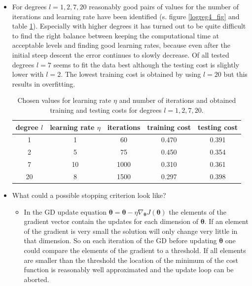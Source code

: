 \documentclass{article}
\begin{document}
\begin{itemize}
\item For degrees $l=1,2,7,20$ reasonably good pairs of values for the number of iterations and learning rate have been identified (s. figure \ref{logreg4_fig} and table \ref{logreg4_tab}). Especially with higher degrees it has turned out to be quite difficult to find the right balance between keeping the computational time at acceptable levels and finding good learning rates, because even after the initial steep descent the error continues to slowly decrease. Of all tested degrees $l=7$ seems to fit the data best although the testing cost is slightly lower with $l=2$. The lowest training cost is obtained by using $l=20$ but this results in overfitting.

\begin{table}[!ht]
\centering
\begin{tabular}{|c||c|c||c|c|}
\hline
degree $l$ & learning rate $\eta$ & iterations & training cost & testing cost \\ \hline \hline
1          & 1                    & 60         & 0.470         & 0.391        \\ \hline
2          & 5                    & 75         & 0.450         & 0.354        \\ \hline
7          & 10                   & 1000       & 0.310         & 0.361        \\ \hline
20         & 8                    & 1500       & 0.297         & 0.398        \\ \hline
\end{tabular}
\caption{Chosen values for learning rate $\eta$ and number of iterations and obtained training and testing costs for degrees $l=1,2,7,20$.}
\label{logreg4_tab}
\end{table}

\item What could a possible stopping criterion look like?

\begin{itemize}
\item In the GD update equation $\boldsymbol{\theta} = \boldsymbol{\theta} - \eta \nabla_{\boldsymbol{\theta}} J(\boldsymbol{\theta})$ the elements of the gradient vector contain the updates for each dimension of $\boldsymbol{\theta}$. If an element of the gradient is very small the solution will only change very little in that dimension. So on each iteration of the GD before updating $\boldsymbol{\theta}$ one could compare the elements of the gradient to a threshold. If all elements are smaller than the threshold the location of the minimum of the cost function is reasonably well approximated and the update loop can be aborted.
\end{itemize}
\end{itemize}
\end{document}
